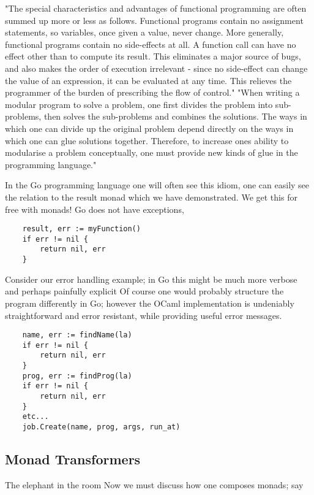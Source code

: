 "The special characteristics and advantages of functional programming are often summed up more or less as follows. Functional programs contain no assignment statements, so variables, once given a value, never change. More generally, functional programs contain no side-effects at all. A function call can have no effect other than to compute its result. This eliminates a major source of bugs, and also makes the order of execution irrelevant - since no side-effect can change the value of an expression, it can be evaluated at any time. This relieves the programmer of the burden of prescribing the flow of control."
"When writing a modular program to solve a problem, one first divides the problem into sub- problems, then solves the sub-problems and combines the solutions. The ways in which one can divide up the original problem depend directly on the ways in which one can glue solutions together. Therefore, to increase ones ability to modularise a problem conceptually, one must provide new kinds of glue in the programming language."
\cite{hughes1989functional}

In the Go programming language one will often see this idiom,
one can easily see the relation to the result monad which we
have demonstrated.
We get this for free with monads!
Go does not have exceptions,

\begin{verbatim}
    result, err := myFunction()
    if err != nil {
        return nil, err
    }
\end{verbatim}

Consider our error handling example;
in Go this might be much more verbose
and perhaps painfully explicit
Of course one would probably structure the program differently in Go;
however the OCaml implementation is undeniably straightforward
and error resistant, while providing useful error messages.

\begin{verbatim}
    name, err := findName(la)
    if err != nil {
        return nil, err
    }
    prog, err := findProg(la)
    if err != nil {
        return nil, err
    }
    etc...
    job.Create(name, prog, args, run_at)
\end{verbatim}

\subsection{Monad Transformers}
The elephant in the room
Now we must discuss how one composes monads;
say


